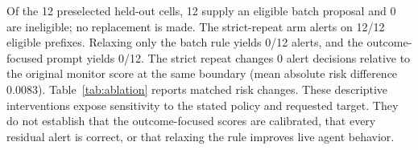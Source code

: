Of the 12 preselected held-out cells, 12 supply an eligible batch proposal and 0 are ineligible; no replacement is made. The strict-repeat arm alerts on 12/12 eligible prefixes. Relaxing only the batch rule yields 0/12 alerts, and the outcome-focused prompt yields 0/12. The strict repeat changes 0 alert decisions relative to the original monitor score at the same boundary (mean absolute risk difference 0.0083). Table~\ref{tab:ablation} reports matched risk changes. These descriptive interventions expose sensitivity to the stated policy and requested target. They do not establish that the outcome-focused scores are calibrated, that every residual alert is correct, or that relaxing the rule improves live agent behavior.
